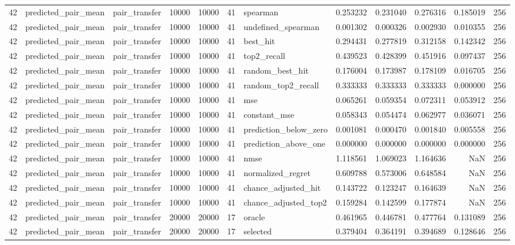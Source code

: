 \begin{tabular}{rllrrrlrrrrr}
42 & predicted_pair_mean & pair_transfer & 10000 & 10000 & 41 & spearman & 0.253232 & 0.231040 & 0.276316 & 0.185019 & 256 \\
42 & predicted_pair_mean & pair_transfer & 10000 & 10000 & 41 & undefined_spearman & 0.001302 & 0.000326 & 0.002930 & 0.010355 & 256 \\
42 & predicted_pair_mean & pair_transfer & 10000 & 10000 & 41 & best_hit & 0.294431 & 0.277819 & 0.312158 & 0.142342 & 256 \\
42 & predicted_pair_mean & pair_transfer & 10000 & 10000 & 41 & top2_recall & 0.439523 & 0.428399 & 0.451916 & 0.097437 & 256 \\
42 & predicted_pair_mean & pair_transfer & 10000 & 10000 & 41 & random_best_hit & 0.176004 & 0.173987 & 0.178109 & 0.016705 & 256 \\
42 & predicted_pair_mean & pair_transfer & 10000 & 10000 & 41 & random_top2_recall & 0.333333 & 0.333333 & 0.333333 & 0.000000 & 256 \\
42 & predicted_pair_mean & pair_transfer & 10000 & 10000 & 41 & mse & 0.065261 & 0.059354 & 0.072311 & 0.053912 & 256 \\
42 & predicted_pair_mean & pair_transfer & 10000 & 10000 & 41 & constant_mse & 0.058343 & 0.054474 & 0.062977 & 0.036071 & 256 \\
42 & predicted_pair_mean & pair_transfer & 10000 & 10000 & 41 & prediction_below_zero & 0.001081 & 0.000470 & 0.001840 & 0.005558 & 256 \\
42 & predicted_pair_mean & pair_transfer & 10000 & 10000 & 41 & prediction_above_one & 0.000000 & 0.000000 & 0.000000 & 0.000000 & 256 \\
42 & predicted_pair_mean & pair_transfer & 10000 & 10000 & 41 & nmse & 1.118561 & 1.069023 & 1.164636 & NaN & 256 \\
42 & predicted_pair_mean & pair_transfer & 10000 & 10000 & 41 & normalized_regret & 0.609788 & 0.573006 & 0.648584 & NaN & 256 \\
42 & predicted_pair_mean & pair_transfer & 10000 & 10000 & 41 & chance_adjusted_hit & 0.143722 & 0.123247 & 0.164639 & NaN & 256 \\
42 & predicted_pair_mean & pair_transfer & 10000 & 10000 & 41 & chance_adjusted_top2 & 0.159284 & 0.142599 & 0.177874 & NaN & 256 \\
42 & predicted_pair_mean & pair_transfer & 20000 & 20000 & 17 & oracle & 0.461965 & 0.446781 & 0.477764 & 0.131089 & 256 \\
42 & predicted_pair_mean & pair_transfer & 20000 & 20000 & 17 & selected & 0.379404 & 0.364191 & 0.394689 & 0.128646 & 256 \\

\end{tabular}
